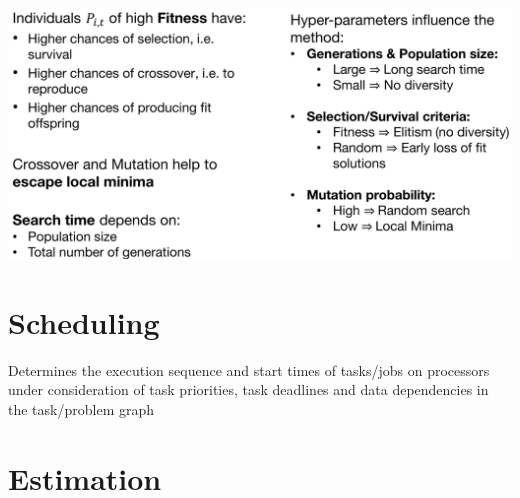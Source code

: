 \documentclass[english]{latex4ei/latex4ei_sheet}
\begin{document}
\begin{center}
  \centering
  \includegraphics[width=0.8\linewidth]{assets/GeneticCharacteristics.png}
  \label{fig:geneticcharacteristics}
\end{center}

\section{Scheduling}
Determines the execution sequence and start times of tasks/jobs on processors under consideration of task priorities, task deadlines and data dependencies in the task/problem graph
\section{Estimation}



\end{document}
